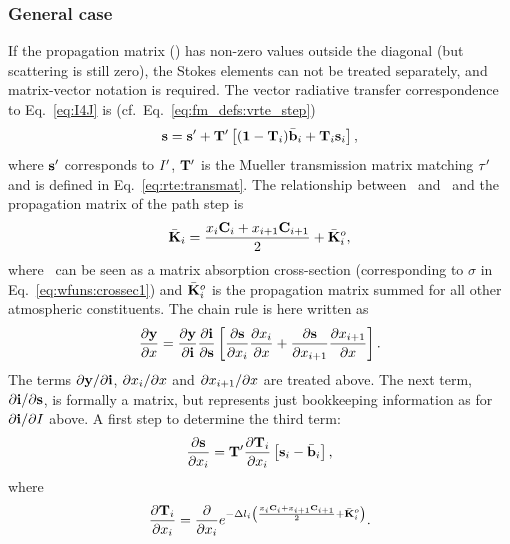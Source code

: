 \subsubsection{General case}
%
If the propagation matrix (\ExtMat) has non-zero values outside the diagonal
(but scattering is still zero), the Stokes elements can not be treated
separately, and matrix-vector notation is required. The vector radiative
transfer correspondence to Eq.~\ref{eq:I4J} is
(cf.~Eq.~\ref{eq:fm_defs:vrte_step})
\begin{equation}
  \label{eq:s4J}
  {\bf s} = {\bf s}' + \mathbf{T}' \left[ (\mathbf{1}-\mathbf{T}_{i})\bar{{\bf b}}_i +
      \mathbf{T}_{i} {\bf s}_{i} \right],
\end{equation}
where ${\bf s}'$ corresponds to $I'$, $\mathbf{T}'$ is the Mueller
transmission matrix matching $\tau'$ and  is defined in
Eq.~\ref{eq:rte:transmat}. The relationship between \ and
\ and the propagation matrix of the path step is
\begin{equation}
  \bar{{\bf K}}_i = \frac{x_{i}\mathbf{C}_i+
                      x_{i+1}\mathbf{C}_{i+1}}{2} + \bar{{\bf K}}_i^o,
\end{equation}
where \ can be seen as a matrix absorption cross-section
(corresponding to $\sigma$ in Eq.~\ref{eq:wfuns:crossec1}) and
$\bar{{\bf K}}_i^o$ is the propagation matrix summed for all other atmospheric
constituents. 
The chain rule is here written as
\begin{equation}
  \label{eq:chainrule2}
  \frac{\partial\mathbf{y}}{\partial x} =  
  \frac{\partial\mathbf{y}}{\partial\mathbf{i}}
  \frac{\partial\mathbf{i}}{\partial{\bf s}} 
  \left[ \frac{\partial{\bf s}}{\partial x_{i}}
         \frac{\partial x_{i}}{\partial x} +
         \frac{\partial{\bf s}}{\partial x_{i+1}}
         \frac{\partial x_{i+1}}{\partial x} 
  \right].
\end{equation}
The terms $\partial\mathbf{y}/\partial\mathbf{i}$, $\partial x_{i}/\partial x$
and $\partial x_{i+1}/\partial x$ are treated above. The next term,
$\partial\mathbf{i}/\partial{\bf s}$, is formally a matrix, but represents just
bookkeeping information as for $\partial\mathbf{i}/\partial I$ above. 
A first step to determine the third term:
\begin{equation}
  \frac{\partial{\bf s}}{\partial x_{i}} = \mathbf{T}'
  \frac{\partial\mathbf{T}_{i}}{\partial x_{i}}
   \left[ {\bf s}_{i}-\bar{{\bf b}}_i\right],
\end{equation}
where
\begin{equation}
  \frac{\partial\mathbf{T}_{i}}{\partial x_{i}} = 
  \frac{\partial}{\partial x_{i}} 
  e^{-\Delta l_{i}\left(\frac{x_{i}\mathbf{C}_i+
            x_{i+1}\mathbf{C}_{i+1}}{2} + \bar{{\bf K}}_i^o \right)}.
\end{equation}
